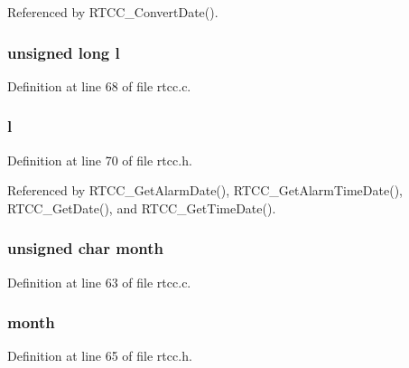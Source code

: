 Referenced by R\-T\-C\-C\-\_\-\-Convert\-Date().

\hypertarget{unionrtcc_date_a99612d7a42af4d8bc748c9de9089b41e}{
\subsubsection[{l}]{\setlength{\rightskip}{0pt plus 5cm}unsigned long l}}\label{unionrtcc_date_a99612d7a42af4d8bc748c9de9089b41e}


Definition at line 68 of file rtcc.\-c.

\hypertarget{unionrtcc_date_a97b22435f07e68bf751cddd2226228ab}{
\subsubsection[{l}]{ l}}\label{unionrtcc_date_a97b22435f07e68bf751cddd2226228ab}


Definition at line 70 of file rtcc.\-h.



Referenced by R\-T\-C\-C\-\_\-\-Get\-Alarm\-Date(), R\-T\-C\-C\-\_\-\-Get\-Alarm\-Time\-Date(), R\-T\-C\-C\-\_\-\-Get\-Date(), and R\-T\-C\-C\-\_\-\-Get\-Time\-Date().

\hypertarget{unionrtcc_date_a4900720b55a67c901372712af062d615}{
\subsubsection[{month}]{\setlength{\rightskip}{0pt plus 5cm}unsigned char month}}\label{unionrtcc_date_a4900720b55a67c901372712af062d615}


Definition at line 63 of file rtcc.\-c.

\hypertarget{unionrtcc_date_ad5f8cd6773aef677b920ae4e4265bb10}{
\subsubsection[{month}]{ month}}\label{unionrtcc_date_ad5f8cd6773aef677b920ae4e4265bb10}


Definition at line 65 of file rtcc.\-h.



